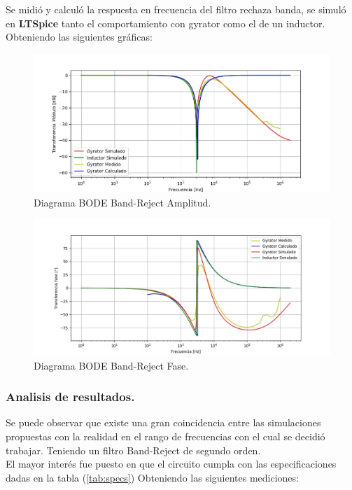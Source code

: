 Se midió y calculó la respuesta en frecuencia del filtro rechaza banda, se simuló en \textbf{LTSpice}  tanto el comportamiento con gyrator como el de un inductor. Obteniendo las siguientes gráficas:
\begin{figure}[H]	
	\centering
	\includegraphics[width=\textwidth]{ImagenesEj2/bodebr.jpg}
	\caption{Diagrama BODE Band-Reject Amplitud.}
	\label{fig:bodebr}
\end{figure}
\begin{figure}[H]	
	\centering
	\includegraphics[width=\textwidth]{ImagenesEj2/bodebrp.jpg}
	\caption{Diagrama BODE Band-Reject Fase.}
	\label{fig:bodebrp}
\end{figure}
\subsubsection{Analisis de resultados.}
Se puede observar que existe una gran coincidencia entre las simulaciones propuestas con la realidad en el rango de frecuencias con el cual se decidió trabajar. Teniendo un filtro Band-Reject de segundo orden.\\
El mayor interés fue puesto en que el circuito cumpla con las especificaciones dadas en la tabla (\ref{tab:specs})
Obteniendo las siguientes mediciones:

